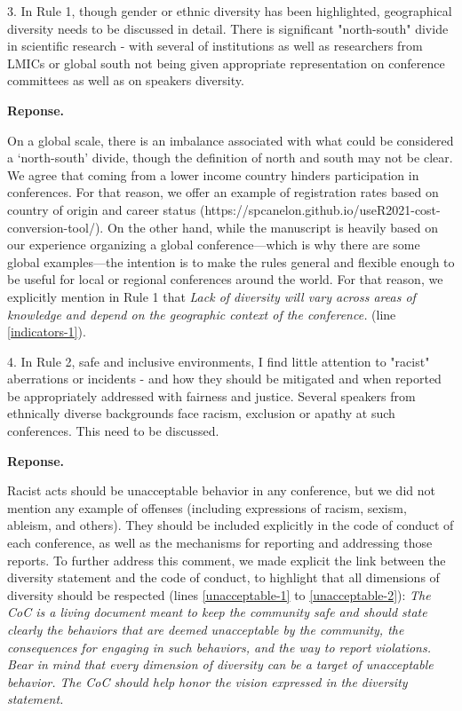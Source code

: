\documentclass{article}
\newenvironment{Reply}{\noindent\color{BlueViolet}\textbf{Reponse.}}{\vspace{1em}}
\begin{document}
3. In Rule 1, though gender or ethnic diversity has been highlighted, geographical diversity needs to be discussed in detail. There is significant "north-south" divide in scientific research - with several of institutions as well as researchers from LMICs or global south not being given appropriate representation on conference committees as well as on speakers diversity.

\begin{Reply}

   On a global scale, there is an imbalance associated with what could be considered a `north-south' divide, though the definition of north and south may not be clear. We agree that coming from a lower income country hinders participation in conferences. For that reason, we offer an example of registration rates based on country of origin and career status (https://spcanelon.github.io/useR2021-cost-conversion-tool/). 
   On the other hand, while the manuscript is heavily based on our experience organizing a global conference—which is why there are some global examples—the intention is to make the rules general and flexible enough to be useful for local or regional conferences around the world. 
   For that reason, we explicitly mention in Rule 1 that \textit{Lack of diversity will vary across areas of knowledge and depend on the geographic context of the conference.} (line \ref{indicators-1}). 

\end{Reply}

4. In Rule 2, safe and inclusive environments, I find little attention to "racist" aberrations or incidents - and how they should be mitigated and when reported be appropriately addressed with fairness and justice.
Several speakers from ethnically diverse backgrounds face racism, exclusion or apathy at such conferences. This need to be discussed.

\begin{Reply}

    Racist acts should be unacceptable behavior in any conference, but we did not mention any example of offenses (including expressions of racism, sexism, ableism, and others). They should be included explicitly in the code of conduct of each conference, as well as the mechanisms for reporting and addressing those reports.
    To further address this comment, we made explicit the link between the diversity statement and the code of conduct, to highlight that all dimensions of diversity should be respected (lines \ref{unacceptable-1} to \ref{unacceptable-2}):
    \textit{The CoC is a living document meant to keep the community safe and should state clearly the behaviors that are deemed unacceptable by the community, the consequences for engaging in such behaviors, and the way to report violations. Bear in mind that every dimension of diversity can be a target of unacceptable behavior. The CoC should help honor the vision expressed in the diversity statement.}
\end{Reply}
\end{document}

